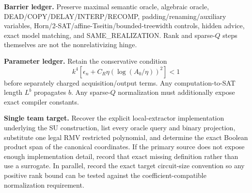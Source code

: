 \documentclass[11pt]{article}
\begin{document}
\textbf{Barrier ledger.}
Preserve maximal semantic oracle, algebraic oracle, DEAD/COPY/DELAY/INTERP/RECOMP, padding/renaming/auxiliary variables, Horn/2-SAT/affine-Tseitin/bounded-treewidth controls, hidden advice, exact model matching, and SAME\_REALIZATION. Rank and sparse-$Q$ steps themselves are not the nonrelativizing hinge.

\textbf{Parameter ledger.}
Retain the conservative condition
\[
k^4[\epsilon_n+C_R\eta(\log(A_0/\eta))^2]<1
\]
before separately charged acquisition/output terms. Any computation-to-SAT length $L^b$ propagates $b$. Any sparse-$Q$ normalization must additionally expose exact compiler constants.

\textbf{Single team target.}
Recover the explicit local-extractor implementation underlying the SU construction, list every oracle query and binary projection, substitute one legal RMV restricted polynomial, and determine the exact Boolean product span of the canonical coordinates. If the primary source does not expose enough implementation detail, record that exact missing definition rather than use a surrogate. In parallel, record the exact target circuit-size convention so any positive rank bound can be tested against the coefficient-compatible normalization requirement.
\end{document}
